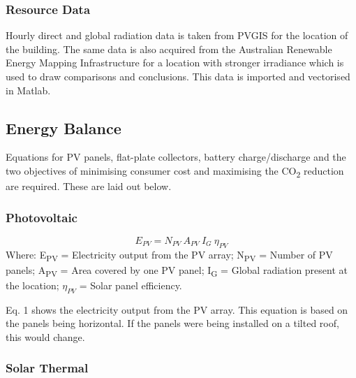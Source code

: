   \subsubsection{Resource Data}
  
  Hourly direct and global radiation data is taken from PVGIS \cite{PVGIS} for the location of the building. The same data is also acquired from the Australian Renewable Energy Mapping Infrastructure \cite{AREMI} for a location with stronger irradiance which is used to draw comparisons and conclusions. This data is imported and vectorised in Matlab.
  
  \subsection{Energy Balance}
  
 Equations for PV panels, flat-plate collectors, battery charge/discharge and the two objectives of minimising consumer cost and maximising the CO\textsubscript{2} reduction are required. These are laid out below.
 
\subsubsection{Photovoltaic}

\begin{equation}
E_{PV} = N_{PV} \ A_{PV} \ I_{G} \ \eta_{PV}
\end{equation}
\newline
Where:\newline
E\textsubscript{PV} = Electricity output from the PV array;\newline
N\textsubscript{PV} = Number of PV panels;\newline
A\textsubscript{PV} = Area covered by one PV panel;\newline
I\textsubscript{G} = Global radiation present at the location;\newline
$\eta _{PV}$ = Solar panel efficiency.\newline

Eq. 1 shows the electricity output from the PV array. This equation is based on the panels being horizontal. If the panels were being installed on a tilted roof, this would change.

\subsubsection{Solar Thermal}

